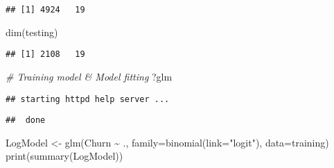 \documentclass[
]{article}
\newenvironment{Shaded}{\begin{snugshade}}{\end{snugshade}}
\newcommand{\AttributeTok}[1]{\textcolor[rgb]{0.77,0.63,0.00}{#1}}
\newcommand{\CommentTok}[1]{\textcolor[rgb]{0.56,0.35,0.01}{\textit{#1}}}
\newcommand{\FunctionTok}[1]{\textcolor[rgb]{0.00,0.00,0.00}{#1}}
\newcommand{\NormalTok}[1]{#1}
\newcommand{\OtherTok}[1]{\textcolor[rgb]{0.56,0.35,0.01}{#1}}
\newcommand{\SpecialCharTok}[1]{\textcolor[rgb]{0.00,0.00,0.00}{#1}}
\newcommand{\StringTok}[1]{\textcolor[rgb]{0.31,0.60,0.02}{#1}}
\begin{document}
\begin{verbatim}
## [1] 4924   19
\end{verbatim}

\begin{Shaded}
\begin{Highlighting}[]
\FunctionTok{dim}\NormalTok{(testing)}
\end{Highlighting}
\end{Shaded}

\begin{verbatim}
## [1] 2108   19
\end{verbatim}

\begin{Shaded}
\begin{Highlighting}[]
\CommentTok{\# Training model \& Model fitting}
\NormalTok{?glm}
\end{Highlighting}
\end{Shaded}

\begin{verbatim}
## starting httpd help server ...
\end{verbatim}

\begin{verbatim}
##  done
\end{verbatim}

\begin{Shaded}
\begin{Highlighting}[]
\NormalTok{LogModel }\OtherTok{\textless{}{-}} \FunctionTok{glm}\NormalTok{(Churn }\SpecialCharTok{\textasciitilde{}}\NormalTok{ ., }\AttributeTok{family=}\FunctionTok{binomial}\NormalTok{(}\AttributeTok{link=}\StringTok{"logit"}\NormalTok{), }\AttributeTok{data=}\NormalTok{training)}
\FunctionTok{print}\NormalTok{(}\FunctionTok{summary}\NormalTok{(LogModel))}
\end{Highlighting}
\end{Shaded}
\end{document}
